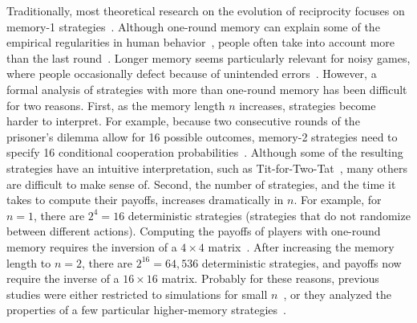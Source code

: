 \documentclass[11pt]{article}
\begin{document}
Traditionally, most theoretical research on the evolution of reciprocity focuses on memory-1 strategies~\citep{nowak:Nature:1993,imhof:PNAS:2005,grujic:jtb:2012,van-segbroeck:prl:2012,press:PNAS:2012,stewart:pnas:2013,Toupo:IJBC:2014,stewart:pnas:2014, akin:EGADS:2016,glynatsi:scientific:2020,chen:PNASnexus:2023}. 
Although one-round memory can explain some of the empirical regularities in human behavior~\cite{engle:ET:2006, dal:AER:2011, camera:GEB:2012, bruttel:TD:2012,Montero-Porras:SciRep:2022},  people often take into account more than the last round~\cite{romero:EER:2018}.
Longer memory seems particularly relevant for noisy games, where people occasionally defect because of unintended errors~\cite{fudenberg:AER:2012}. 
However, a formal analysis of strategies with more than one-round memory has been difficult for two reasons. 
First, as the memory length $n$ increases, strategies become harder to interpret. 
For example, because two consecutive rounds of the prisoner's dilemma allow for 16 possible outcomes, memory-2 strategies need to specify 16 conditional cooperation probabilities~\citep{hauert:PRSB:1997}. 
Although some of the resulting strategies have an intuitive interpretation, such as Tit-for-Two-Tat~\citep{axelrod:AAAS:1981}, many others are difficult to make sense of. 
Second, the number of strategies, and the time it takes to compute their payoffs, increases dramatically in $n$. 
For example, for $n\!=\!1$, there are $2^4\!=\!16$ deterministic strategies (strategies that do not randomize between different actions). 
Computing the payoffs of players with one-round memory requires the inversion of a $4\!\times\!4$ matrix~\cite{sigmund2010}. 
After increasing the memory length to $n\!=\!2$, there are $2^{16}\!=\!64,536$ deterministic strategies, and payoffs now require the inverse of a $16\!\times\!16$ matrix. 
Probably for these reasons, previous studies were either restricted to simulations for small $n$~\citep{hauert:PRSB:1997,stewart:scientific:2016,Murase:PLoSCompBio:2023a}, or they analyzed the properties of a few particular higher-memory strategies~\citep{hilbe:PNAS:2017,ueda:RSOP:2021,li:NatureCompSci:2022}. 
\end{document}
